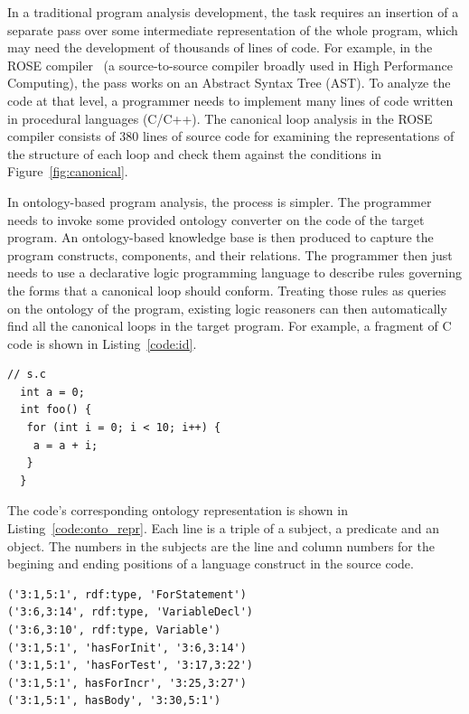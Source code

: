In a
traditional program analysis development, the task requires an
insertion of a separate pass over some intermediate representation of
the whole program, which may need the development of thousands of
lines of code. For example, in the ROSE compiler~\cite{ROSE} (a
source-to-source compiler broadly used in High Performance Computing),
the pass works on an Abstract Syntax Tree (AST). To analyze the code
at that level, a programmer needs to implement many lines of code
written in procedural languages (C/C++).  The canonical loop analysis
in the ROSE compiler consists of 380 lines of source code for examining
the representations of the structure of each loop and check them
against the conditions in Figure~\ref{fig:canonical}.

In ontology-based program analysis, the process is simpler. The
programmer needs to invoke some provided ontology converter on the
code of the target program. An ontology-based knowledge base is then
produced to capture the program constructs, components, and their
relations.  The programmer then just needs to use a declarative logic
programming language to describe rules governing the forms that a
canonical loop should conform. Treating those rules as queries on the
ontology of the program, existing logic reasoners can then
automatically find all the canonical loops in the target program.
For example, a fragment of C code is shown in Listing~\ref{code:id}.
\begin{lstlisting}[numbersep=-8pt,firstnumber=0,
xleftmargin=.1\columnwidth,
xrightmargin=.1\columnwidth, float,
caption=Example C code fragment, label=code:id]
  // s.c
  int a = 0;
  int foo() {
   for (int i = 0; i < 10; i++) {
    a = a + i;
   }
  }
\end{lstlisting} 
The code's corresponding ontology representation is shown in Listing~\ref{code:onto_repr}.
Each line is a triple of a subject, a predicate and an object.
The numbers in the subjects are the line and column numbers for the begining and ending positions of a language construct in the source code. 
\begin{lstlisting}[xleftmargin=.1\columnwidth,
xrightmargin=.1\columnwidth, float,
caption=Sample ontology for C snippet, label=code:onto_repr]
('3:1,5:1', rdf:type, 'ForStatement')
('3:6,3:14', rdf:type, 'VariableDecl')
('3:6,3:10', rdf:type, Variable')
('3:1,5:1', 'hasForInit', '3:6,3:14')
('3:1,5:1', 'hasForTest', '3:17,3:22')
('3:1,5:1', hasForIncr', '3:25,3:27')
('3:1,5:1', hasBody', '3:30,5:1')
\end{lstlisting}
